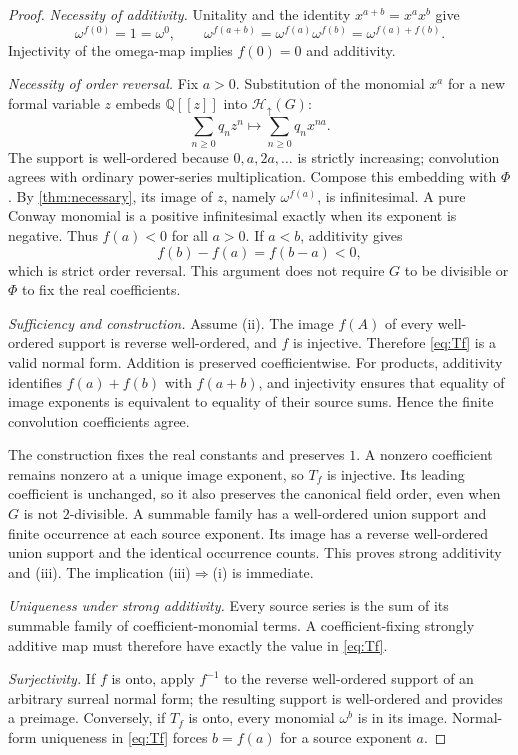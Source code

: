 \documentclass[11pt,letterpaper]{article}
\theoremstyle{definition}
\theoremstyle{remark}
\newcommand{\Q}{\mathbb Q}
\newcommand{\Hu}[1]{\mathcal H_{\uparrow}(#1)}
\begin{document}
\begin{proof}
\emph{Necessity of additivity.}
Unitality and the identity $x^{a+b}=x^ax^b$ give
\[
 \omega^{f(0)}=1=\omega^0,
 \qquad
 \omega^{f(a+b)}=\omega^{f(a)}\omega^{f(b)}
               =\omega^{f(a)+f(b)}.
\]
Injectivity of the omega-map implies $f(0)=0$ and additivity.

\emph{Necessity of order reversal.}
Fix $a>0$. Substitution of the monomial $x^a$ for a new formal variable $z$
embeds $\Q[[z]]$ into $\Hu{G}$:
\[
 \sum_{n\ge0}q_nz^n\longmapsto\sum_{n\ge0}q_nx^{na}.
\]
The support is well-ordered because $0,a,2a,\ldots$ is strictly increasing;
convolution agrees with ordinary power-series multiplication. Compose this
embedding with $\Phi$. By \cref{thm:necessary}, its image of $z$, namely
$\omega^{f(a)}$, is infinitesimal. A pure Conway monomial is a positive
infinitesimal exactly when its exponent is negative. Thus $f(a)<0$ for
all $a>0$. If $a<b$, additivity gives
\[
 f(b)-f(a)=f(b-a)<0,
\]
which is strict order reversal. This argument does not require $G$ to be
divisible or $\Phi$ to fix the real coefficients.

\emph{Sufficiency and construction.}
Assume (ii). The image $f(A)$ of every well-ordered support is reverse
well-ordered, and $f$ is injective. Therefore \eqref{eq:Tf} is a valid
normal form. Addition is preserved coefficientwise. For products, additivity
identifies $f(a)+f(b)$ with $f(a+b)$, and injectivity ensures that equality
of image exponents is equivalent to equality of their source sums. Hence
the finite convolution coefficients agree.

The construction fixes the real constants and preserves $1$. A nonzero
coefficient remains nonzero at a unique image exponent, so $T_f$ is injective.
Its leading coefficient is unchanged, so it also preserves the canonical
field order, even when $G$ is not $2$-divisible.
A summable family has a well-ordered union support and finite occurrence at
each source exponent. Its image has a reverse well-ordered union support
and the identical occurrence counts. This proves strong additivity and
(iii). The implication (iii)$\Rightarrow$(i) is immediate.

\emph{Uniqueness under strong additivity.}
Every source series is the sum of its summable family of coefficient-monomial
terms. A coefficient-fixing strongly additive map must therefore have exactly
the value in \eqref{eq:Tf}.

\emph{Surjectivity.}
If $f$ is onto, apply $f^{-1}$ to the reverse well-ordered support of an
arbitrary surreal normal form; the resulting support is well-ordered and
provides a preimage. Conversely, if $T_f$ is onto, every monomial $\omega^b$
is in its image. Normal-form uniqueness in \eqref{eq:Tf} forces
$b=f(a)$ for a source exponent $a$.
\end{proof}
\end{document}
